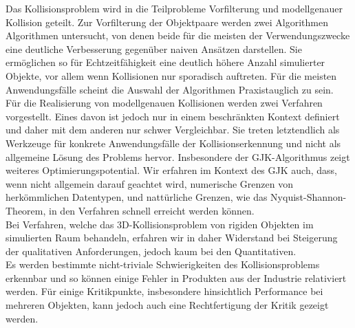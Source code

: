 
Das Kollisionsproblem wird in die Teilprobleme Vorfilterung und modellgenauer Kollision
geteilt. Zur Vorfilterung der Objektpaare werden zwei Algorithmen Algorithmen untersucht, von denen beide für die meisten der Verwendungszwecke eine deutliche Verbesserung gegenüber naiven Ansätzen darstellen. Sie ermöglichen so für Echtzeitfähigkeit eine deutlich höhere Anzahl simulierter Objekte, vor allem wenn Kollisionen nur sporadisch auftreten. Für die meisten Anwendungsfälle scheint die Auswahl der Algorithmen Praxistauglich zu sein.\\
Für die Realisierung von modellgenauen Kollisionen werden zwei Verfahren vorgestellt.
Eines davon ist jedoch nur in einem beschränkten Kontext definiert und daher mit dem anderen nur schwer Vergleichbar. Sie treten letztendlich als Werkzeuge für konkrete Anwendungsfälle der Kollisionserkennung und nicht als allgemeine Lösung des Problems hervor. Insbesondere der GJK-Algorithmus zeigt weiteres Optimierungspotential. Wir erfahren im Kontext des GJK auch, dass, wenn nicht allgemein darauf geachtet wird, numerische Grenzen von herkömmlichen Datentypen, und nattürliche Grenzen, wie das Nyquist-Shannon-Theorem, in den Verfahren schnell erreicht werden können.\\
Bei Verfahren, welche das 3D-Kollisionsproblem von rigiden Objekten im simulierten Raum behandeln, erfahren wir in daher Widerstand bei Steigerung der qualitativen Anforderungen, jedoch kaum bei den Quantitativen.\\
Es werden bestimmte nicht-triviale Schwierigkeiten des Kollisionsproblems erkennbar und so können einige Fehler in Produkten aus der Industrie relativiert werden. Für einige Kritikpunkte, insbesondere hinsichtlich Performance bei mehreren Objekten, kann jedoch auch eine Rechtfertigung der Kritik gezeigt werden.

